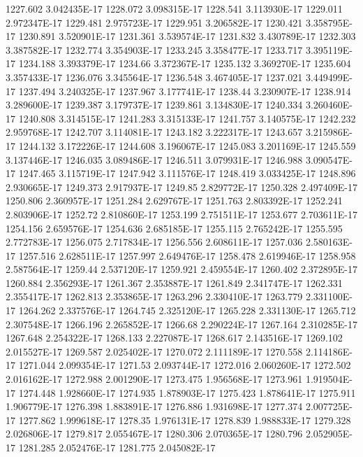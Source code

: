 1227.602  3.042435E-17
1228.072  3.098315E-17
1228.541  3.113930E-17
1229.011  2.972347E-17
1229.481  2.975723E-17
1229.951  3.206582E-17
1230.421  3.358795E-17
1230.891  3.520901E-17
1231.361  3.539574E-17
1231.832  3.430789E-17
1232.303  3.387582E-17
1232.774  3.354903E-17
1233.245  3.358477E-17
1233.717  3.395119E-17
1234.188  3.393379E-17
1234.66  3.372367E-17
1235.132  3.369270E-17
1235.604  3.357433E-17
1236.076  3.345564E-17
1236.548  3.467405E-17
1237.021  3.449499E-17
1237.494  3.240325E-17
1237.967  3.177741E-17
1238.44  3.230907E-17
1238.914  3.289600E-17
1239.387  3.179737E-17
1239.861  3.134830E-17
1240.334  3.260460E-17
1240.808  3.314515E-17
1241.283  3.315133E-17
1241.757  3.140575E-17
1242.232  2.959768E-17
1242.707  3.114081E-17
1243.182  3.222317E-17
1243.657  3.215986E-17
1244.132  3.172226E-17
1244.608  3.196067E-17
1245.083  3.201169E-17
1245.559  3.137446E-17
1246.035  3.089486E-17
1246.511  3.079931E-17
1246.988  3.090547E-17
1247.465  3.115719E-17
1247.942  3.111576E-17
1248.419  3.033425E-17
1248.896  2.930665E-17
1249.373  2.917937E-17
1249.85  2.829772E-17
1250.328  2.497409E-17
1250.806  2.360957E-17
1251.284  2.629767E-17
1251.763  2.803392E-17
1252.241  2.803906E-17
1252.72  2.810860E-17
1253.199  2.751511E-17
1253.677  2.703611E-17
1254.156  2.659576E-17
1254.636  2.685185E-17
1255.115  2.765242E-17
1255.595  2.772783E-17
1256.075  2.717834E-17
1256.556  2.608611E-17
1257.036  2.580163E-17
1257.516  2.628511E-17
1257.997  2.649476E-17
1258.478  2.619946E-17
1258.958  2.587564E-17
1259.44  2.537120E-17
1259.921  2.459554E-17
1260.402  2.372895E-17
1260.884  2.356293E-17
1261.367  2.353887E-17
1261.849  2.341747E-17
1262.331  2.355417E-17
1262.813  2.353865E-17
1263.296  2.330410E-17
1263.779  2.331100E-17
1264.262  2.337576E-17
1264.745  2.325120E-17
1265.228  2.331130E-17
1265.712  2.307548E-17
1266.196  2.265852E-17
1266.68  2.290224E-17
1267.164  2.310285E-17
1267.648  2.254322E-17
1268.133  2.227087E-17
1268.617  2.143516E-17
1269.102  2.015527E-17
1269.587  2.025402E-17
1270.072  2.111189E-17
1270.558  2.114186E-17
1271.044  2.099354E-17
1271.53  2.093744E-17
1272.016  2.060260E-17
1272.502  2.016162E-17
1272.988  2.001290E-17
1273.475  1.956568E-17
1273.961  1.919504E-17
1274.448  1.928660E-17
1274.935  1.878903E-17
1275.423  1.878641E-17
1275.911  1.906779E-17
1276.398  1.883891E-17
1276.886  1.931698E-17
1277.374  2.007725E-17
1277.862  1.999618E-17
1278.35  1.976131E-17
1278.839  1.988833E-17
1279.328  2.026806E-17
1279.817  2.055467E-17
1280.306  2.070365E-17
1280.796  2.052905E-17
1281.285  2.052476E-17
1281.775  2.045082E-17
